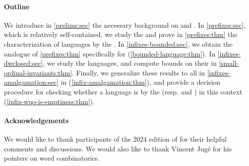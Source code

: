 \paragraph*{Outline} 
We introduce in \cref{prelims:sec} the
necessary background on  and .
In
\cref{prefixes:sec}, which is relatively
self-contained, we study the  and prove in
\cref{prefixes:thm} the characterization of 
languages by the . In
\cref{infixes-bounded:sec}, we
obtain the  analogue of \cref{prefixes:thm}
specifically for 
(\cref{bounded-language:thm}). 
In \cref{infixes-dwclosed:sec}, we study the 
languages, and compute bounds on their  in \cref{small-ordinal-invariants:thm}.
Finally, 
we generalize these results to all
 in \cref{infixes-amalgamation:sec}
in
(\cref{infix-amalgamation:thm}),
and provide a decision procedure for checking whether a language is
 by the  (resp.  and ) in
this context (\cref{infix-wqo-is-emptiness:thm}).

\paragraph*{Acknowledgements} We would like to thank participants of the 2024
edition of  for their helpful comments and discussions.
We would also like to thank Vincent Jugé for his pointers on word combinatorics.
